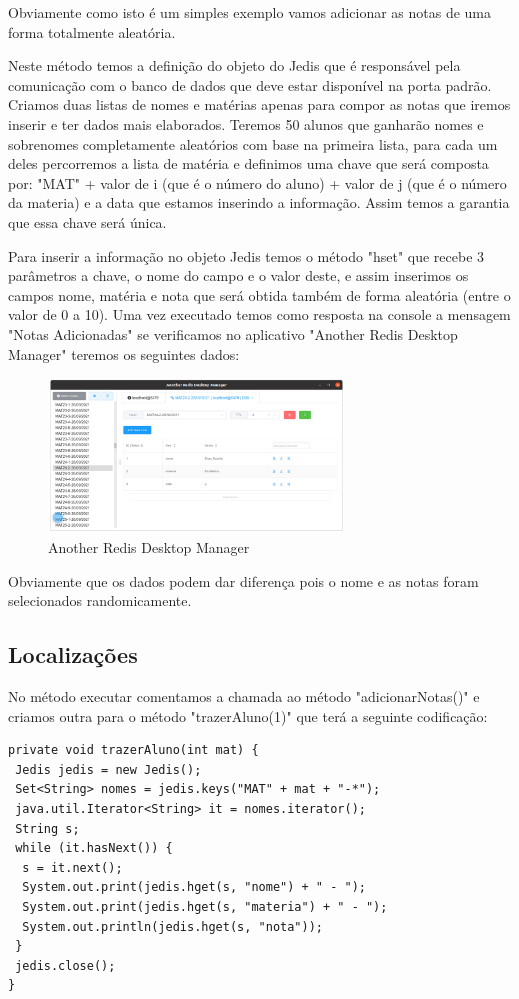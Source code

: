 Obviamente como isto é um simples exemplo vamos adicionar as notas de uma forma totalmente aleatória.

Neste método temos a definição do objeto do Jedis que é responsável pela comunicação com o banco de dados que deve estar disponível na porta padrão. Criamos duas listas de nomes e matérias apenas para compor as notas que iremos inserir e ter dados mais elaborados. Teremos 50 alunos que ganharão nomes e sobrenomes completamente aleatórios com base na primeira lista, para cada um deles percorremos a lista de matéria e definimos uma chave que será composta por: "MAT" + valor de i (que é o número do aluno) + valor de j (que é o número da materia) e a data que estamos inserindo a informação. Assim temos a garantia que essa chave será única.

Para inserir a informação no objeto Jedis temos o método "hset" que recebe 3 parâmetros a chave, o nome do campo e o valor deste, e assim inserimos os campos nome, matéria e nota que será obtida também de forma aleatória (entre o valor de 0 a 10). Uma vez executado temos como resposta na console a mensagem "Notas Adicionadas" se verificamos no aplicativo "Another Redis Desktop Manager" teremos os seguintes dados:
\begin{figure}[H]
	\centering
	\includegraphics[width=0.7\textwidth]{imagens/notasAlunos}
	\caption{Another Redis Desktop Manager}
\end{figure}

Obviamente que os dados podem dar diferença pois o nome e as notas foram selecionados randomicamente.

\subsection{Localizações}
No método executar comentamos a chamada ao método "adicionarNotas()" e criamos outra para o método "trazerAluno(1)" que terá a seguinte codificação:
\begin{lstlisting}[]
private void trazerAluno(int mat) {
 Jedis jedis = new Jedis();
 Set<String> nomes = jedis.keys("MAT" + mat + "-*");
 java.util.Iterator<String> it = nomes.iterator();
 String s;
 while (it.hasNext()) {
  s = it.next();
  System.out.print(jedis.hget(s, "nome") + " - ");
  System.out.print(jedis.hget(s, "materia") + " - ");
  System.out.println(jedis.hget(s, "nota"));
 }
 jedis.close();
}	
\end{lstlisting}

